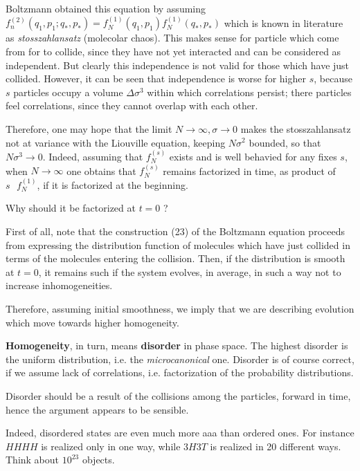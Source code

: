 \documentclass{article}
\begin{document}
Boltzmann obtained this equation by assuming $f_n^{(2)}(q_1,p_1;q_{\ast},p_{\ast}) = f_N^{(1)}(q_1,p_1)f_N^{(1)}(q_{\ast},p_{\ast}) $ which is known in literature as \emph{stosszahlansatz} (molecolar chaos). This makes sense for particle which come from for to collide, since they have not yet interacted and can be considered as independent. But clearly this independence is not valid for those which have just collided. However, it can be seen that independence is worse for higher $s$, because $s$ particles occupy a volume $\Delta \sigma^3$ within which correlations persist; there particles feel correlations, since they cannot overlap with each other.\newline

Therefore, one may hope that the limit $N \to \infty, \sigma \to 0$ makes the stosszahlansatz not at variance with the Liouville equation, keeping $N \sigma^2$ bounded, so that $N \sigma^3 \to 0$. Indeed, assuming that $f_N^{(s)}$ exists and is well behavied for any fixes $s$, when $N \to \infty$  one obtains that $f_N^{(s)}$ remains factorized in time, as product of $s \textit{ } f_N^{(1)}$, if it is factorized at the beginning.
\newline

Why should it be factorized at $t=0$ ? 

First of all, note that the construction (23) of the Boltzmann equation proceeds from expressing the distribution function of molecules which have just collided in terms of the molecules entering the collision. Then, if the distribution is smooth at $t=0$, it remains such if the system evolves, in average, in such a way not to increase inhomogeneities.

Therefore, assuming initial smoothness, we imply that we are describing evolution which move towards higher homogeneity.

\textbf{Homogeneity}, in turn, means \textbf{disorder} in phase space. The highest disorder is the uniform distribution, i.e. the \emph{microcanonical} one. Disorder is of course correct, if we assume lack of correlations, i.e. factorization of the probability distributions.

Disorder should be a result of the collisions among the particles, forward in time, hence the argument appears to be sensible.

Indeed, disordered states are even much more aaa than ordered ones. For instance $HHHH$ is realized only in one way, while $3H3T$ is realized in 20 different ways. Think about $10^{23}$ objects.
\end{document}
